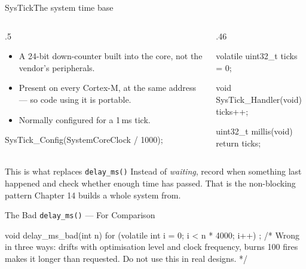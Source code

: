 \documentclass[9pt,aspectratio=169,xcolor=table]{beamer}
\begin{document}
\begin{frame}[fragile]{SysTick}{The system time base}
    \begin{columns}[T]
    \begin{column}{.5\textwidth}
        \begin{itemize}
            \item A \alert{24-bit} down-counter built into the \alert{core}, not
                  the vendor's peripherals.
            \item Present on \alert{every} Cortex-M, at the same address --- so
                  code using it is portable.
            \item Normally configured for a \alert{1\,ms} tick.
        \end{itemize}

        \vspace{2mm}
        {\ttfamily\scriptsize SysTick\_Config(SystemCoreClock / 1000);}
    \end{column}
    \begin{column}{.46\textwidth}
\begin{cc}[basicstyle=\ttfamily\small]
	volatile uint32_t ticks = 0;

	void SysTick_Handler(void)
	{
		ticks++;
	}

	uint32_t millis(void)
	{
		return ticks;
	}
\end{cc}
    \end{column}
    \end{columns}

    \vspace{3mm}
    \begin{block}{This is what replaces \texttt{delay\_ms()}}
        Instead of \emph{waiting}, record when something last happened and check
        whether enough time has passed. That is the \alert{non-blocking} pattern
        Chapter 14 builds a whole system from.
    \end{block}
\end{frame}

\begin{frame}[fragile]{The Bad \texttt{delay\_ms()} --- For Comparison}
\begin{cc}[basicstyle=\ttfamily\small]
		void delay_ms_bad(int n)
		{
			for (volatile int i = 0; i < n * 4000; i++)
			;
			/* Wrong in three ways: drifts with optimisation level
			and clock frequency, burns 100%
			fires makes it longer than requested. Do not use this
			in real designs. */
		}
	\end{cc}
\end{frame}
\end{document}

